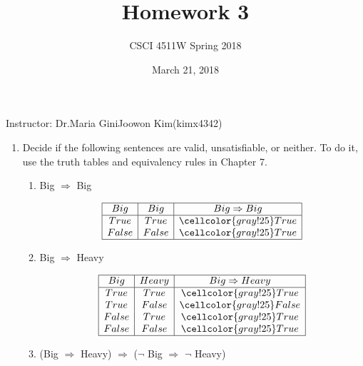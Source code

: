 \documentclass[10pt]{article}
\title{Homework 3}
\author{CSCI 4511W Spring 2018}
\begin{document}
\date{March 21, 2018}
\maketitle

Instructor: Dr.Maria Gini\hfill Joowon Kim(kimx4342)

\hrulefill

\begin{enumerate}
\item Decide if the following sentences are valid, unsatisfiable, or neither. To do it, use the truth tables and equivalency rules in Chapter 7.
  \begin{enumerate}
  \item Big $\Rightarrow$ Big \par
  \begin{displaymath}
    \begin{array} {|c|c|c|}
  	  \hline
      Big & Big & Big \Rightarrow Big \\
      \hline
      True & True & \cellcolor{gray!25}True\\
      False & False & \cellcolor{gray!25}True\\
      \hline
    \end{array}
  \end{displaymath}
  \item Big $\Rightarrow$ Heavy \par
   \begin{displaymath}
    \begin{array} {|c|c|c|}
  	  \hline
      Big & Heavy & Big \Rightarrow Heavy \\
      \hline
      True & True & \cellcolor{gray!25}True \\
      True & False & \cellcolor{gray!25}False \\
      False & True & \cellcolor{gray!25}True \\
      False & False & \cellcolor{gray!25}True \\
      \hline
    \end{array}
  \end{displaymath}
  \item (Big $\Rightarrow$ Heavy) $\Rightarrow$ ($\neg$ Big $\Rightarrow$ $\neg$ Heavy) \par
   \begin{displaymath}
    \begin{array} {|c|c|c|c|c|c|}

\end{array}
\end{displaymath}
\end{enumerate}
\end{enumerate}
\end{document}
